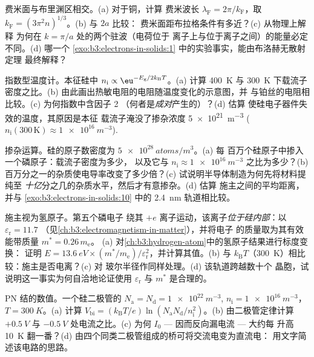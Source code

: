 \begin{exercise}[$\star\star$]\label{exo:b3:electrons-in-solids:7}
费米面与布里渊区相交。(a) 对于铜，计算
费米波长 $\lambda_{\text{F}} = 2\pi/k_{\text{F}}$，取 
$k_{\text{F}} = (3\pi^2n)^{1/3}$。(b) 与 $2a$ 比较：
费米面距布拉格条件有多近？(c) 从物理上解释
为何在 $k = \pi/a$ 处的两个驻波（电荷位于
离子上与位于离子之间）的能量必定不同。(d) 哪一个
\cref{exo:b3:electrons-in-solids:1} 中的实验事实，能由布洛赫无散射定理
最终解释？
\end{exercise}

\begin{exercise}[$\star\star$]\label{exo:b3:electrons-in-solids:8}
指数型温度计。本征硅中 $n_{\text{i}}
\propto \eu^{-E_{\text{g}}/2k_{\text{B}}T}$。(a) 计算 
\qty{400}{K} 与 \qty{300}{K} 下载流子密度之比。(b)
由此画出热敏电阻的电阻随温度变化的示意图，并
与铂丝的电阻相比较。(c) 为何指数中含因子 2
（何者是\emph{成对}产生的）？(d) 估算
使硅电子器件失效的温度，其原因是本征
载流子淹没了掺杂浓度 \qty{5e21}{m^{-3}}
($n_{\text{i}}(300\,\text{K}) \approx \qty{1e16}{m^{-3}}$).
\end{exercise}

\begin{exercise}[$\star\star$]\label{exo:b3:electrons-in-solids:9}
掺杂运算。硅的原子数密度为 $\qty{5e28}{atoms/m^3}$。(a) 每
百万个硅原子中掺入一个磷原子：载流子密度为多少，
以及它与 $n_{\text{i}} \approx \qty{1e16}{m^{-3}}$ 之比为多少？(b)
百万分之一的杂质使电导率改变了多少倍？(c)
试说明半导体制造为何先将材料提纯至
\emph{十亿}分之几的杂质水平，然后才有意掺杂。(d) 估算
施主之间的平均距离，并与 
\cref{exo:b3:electrons-in-solids:10} 中的 \qty{2.4}{nm} 轨道相比较。
\end{exercise}

\begin{exercise}[$\star\star\star$]\label{exo:b3:electrons-in-solids:10}
施主视为氢原子。第五个磷电子
绕其 $+e$ 离子运动，该离子\emph{位于硅内部}：以 
$\varepsilon_{\text{r}} = 11.7$
（见\cref{ch:b3:electromagnetism-in-matter}），并将电子
的质量取为其有效能带质量 $m^* = 0.26\,m_{\text{e}}$。
(a) 对\cref{ch:b3:hydrogen-atom}中的氢原子结果进行标度变换：
证明 $E = \qty{13.6}{eV}\times(m^*/m_{\text{e}})/
\varepsilon_{\text{r}}^2$，并计算其值。(b) 与 
$k_{\text{B}}T$（\qty{300}{K}）相比较：施主是否电离？(c) 对
玻尔半径作同样处理。(d) 该轨道跨越数十个
晶胞，试说明这一事实为何自洽地论证使用
$\varepsilon_{\text{r}}$ 与 $m^*$ 是合理的。
\end{exercise}

\begin{exercise}[$\star\star\star$]\label{exo:b3:electrons-in-solids:11}
PN 结的数值。一个硅二极管的 $N_{\text{a}} =
N_{\text{d}} = \qty{1e22}{m^{-3}}$, $n_{\text{i}} =
\qty{1e16}{m^{-3}}$，$T = \qty{300}{K}$。(a) 计算 
$V_{\text{bi}} = (k_{\text{B}}T/e)\ln(N_{\text{a}}N_{\text{d}}/
n_{\text{i}}^2)$。(b) 由二极管定律计算 
$+\qty{0.5}{V}$ 与 $-\qty{0.5}{V}$ 处电流之比。(c) 为何 
$I_0$ --- 因而反向漏电流 --- 大约每
升高 \qty{10}{K} 翻一番？(d) 由四个同类二极管组成的桥可将交流电变为直流电：
用文字简述该电路的思路。
\end{exercise}

